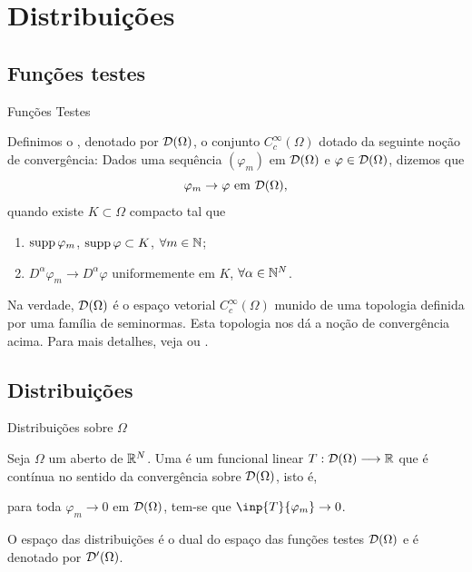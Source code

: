 
\section{Distribuições}

\subsection*{Funções testes}
\begin{frame}{Funções Testes}
	\begin{defin}
		Definimos o , denotado por $\mathcal{D}(\Omega)$, o conjunto $C_c^\infty(\Omega)$ dotado da seguinte noção de convergência: Dados uma sequência $(\varphi_m)$ em  $\mathcal{D}(\Omega)$ e $\varphi\in \mathcal{D}(\Omega)$, dizemos que 
		\[\varphi_m\to \varphi \text{ em } \mathcal{D}(\Omega),\]
		quando existe $K\subset \Omega$ compacto tal que 
		\begin{enumerate}
			\item $\operatorname{supp} \varphi_m$, $\operatorname{supp} \varphi\subset K$, $\forall m\in \mathbb{N}$;
			\item $D^\alpha \varphi_m\to D^\alpha \varphi$ uniformemente em $K$, $\forall \alpha\in \mathbb{N}^N$.
		\end{enumerate}
	\end{defin}


	Na verdade, $\mathcal{D}(\Omega)$ é o espaço vetorial $C_c^\infty(\Omega)$ munido de uma topologia definida por uma família de seminormas. Esta topologia nos dá a noção de convergência  acima. Para mais detalhes, veja \cite[Appendix 2]{kesavan} ou \cite[Seção 1.3]{cavalcanti-dist}.

\end{frame}



\subsection*{Distribuições}
\begin{frame}{Distribuições sobre $\Omega$}
	\begin{defin}
		Seja $\Omega$ um aberto de $\mathbb{R}^N$.	Uma  é um funcional linear $T:\mathcal{D}(\Omega)\longrightarrow \mathbb{R}$ que é contínua no sentido da convergência sobre $\mathcal{D}(\Omega)$, isto é, 
		\begin{center}
			para toda $\varphi_m\to 0$ em $\mathcal{D}(\Omega)$, tem-se que 
			$\inp{T}{\varphi_m}\to 0$.
		\end{center}
		
		
		O espaço das distribuições é o dual do espaço das funções testes $\mathcal{D}(\Omega)$ e é denotado por $\mathcal{D}'(\Omega)$.
	\end{defin}
\end{frame}

